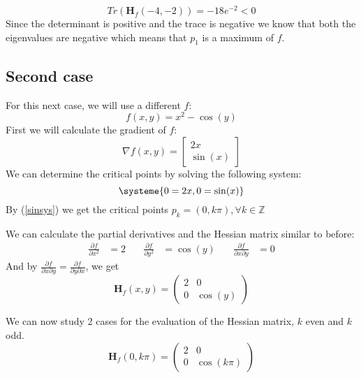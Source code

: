 \documentclass[../convex_optimization.tex]{subfiles}
\newcommand{\Z}{\mathbb{Z}}
\begin{document}
\begin{equation}
    Tr(\mathbf H_f(-4,-2)) = -18e^ {-2 }<0 
    \nonumber
\end{equation}
Since the determinant is positive and the trace is negative we know that
both the eigenvalues are negative which means that
$p_1$ is a maximum of $f$.


\subsection{Second case}
For this next case, we will use a different $f$:
\begin{equation}
    f(x, y )=x^2 - \cos(y)
\end{equation}
First  we will calculate the gradient of $f$:
\begin{equation}
\nabla f(x,y) = 
\begin{bmatrix}
    2x \\ \sin(x)
\end{bmatrix}
\end{equation}
We can determine the critical points by solving the following system:
\begin{equation}
    \systeme{0 = 2x,0 = \sin(x)}
    \label{sinsys}
\end{equation}
By (\ref{sinsys}) we get the critical points
$p_k = (0, k\pi), \forall k \in \Z$

We can calculate the partial derivatives and the Hessian matrix similar to before:
\begin{align}
   \frac{\partial f}{\partial x^2} &= 2\nonumber & \quad
   \frac{\partial f}{\partial y^2} &= \cos(y)\nonumber & \quad
\frac{\partial f}{\partial x \partial y } &= 0 \nonumber 
\end{align}
And by 
$\frac{\partial f}{\partial x \partial y }=\frac{\partial f}{\partial y \partial x }$, we get
\begin{equation}
   \mathbf H_f(x,y) =\begin{pmatrix}
       2  & 0\\
       0 & \cos(y)
   \end{pmatrix}
\end{equation}

We can now study 2 cases for the evaluation of the Hessian matrix, $k$ even and $k$ odd.
\begin{equation}
    \mathbf H_f(0, k\pi) =\begin{pmatrix}
        2  & 0\\
        0 & \cos(k\pi)
    \end{pmatrix}\nonumber
\end{equation}
\end{document}
